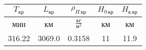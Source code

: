 \begin{tabular}{|c|c|c|c|c|}
\hline
$T_{кр}$ & $L_{кр}$ & $\rho_{H\, кр}$ & $H_{0\, кр}$ & $H_{к\, кр}$ \\ 
\hline
мин & км & $\frac{кг}{м^3}$ & км & км \\ 
\hline
316.22 & 3069.0 & 0.3158 & 11 & 11.9 \\ 
\hline
\end{tabular}